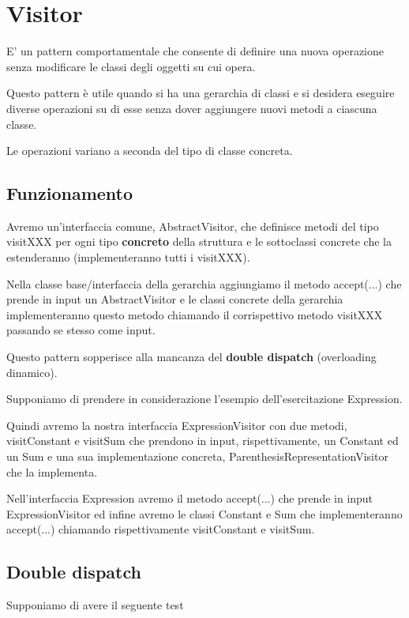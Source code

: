 \chapter{Visitor}

E' un pattern comportamentale che consente di definire una nuova operazione senza modificare le classi degli oggetti su cui opera. 

Questo pattern è utile quando si ha una gerarchia di classi e si desidera eseguire diverse operazioni su di esse senza dover aggiungere nuovi metodi a ciascuna classe.

Le operazioni variano a seconda del tipo di classe concreta.

\section{Funzionamento}

Avremo un'interfaccia comune, AbstractVisitor, che definisce metodi del tipo visitXXX per ogni tipo \textbf{concreto} della struttura e le sottoclassi concrete che 
la estenderanno (implementeranno tutti i visitXXX).

Nella classe base/interfaccia della gerarchia aggiungiamo il metodo accept(...) che prende in input un AbstractVisitor e le classi concrete della gerarchia 
implementeranno questo metodo chiamando il corrispettivo metodo visitXXX passando se stesso come input.

Questo pattern sopperisce alla mancanza del \textbf{double dispatch}  (overloading dinamico).

Supponiamo di prendere in considerazione l'esempio dell'esercitazione Expression.

Quindi avremo la nostra interfaccia ExpressionVisitor con due metodi, visitConstant e visitSum che prendono in input, rispettivamente, un Constant ed un Sum e una sua 
implementazione concreta, ParenthesisRepresentationVisitor che la implementa. 

Nell'interfaccia Expression avremo il metodo accept(...) che prende in input ExpressionVisitor ed infine avremo le classi Constant e Sum che implementeranno accept(...) 
chiamando rispettivamente visitConstant e visitSum.

\section{Double dispatch}

Supponiamo di avere il seguente test

